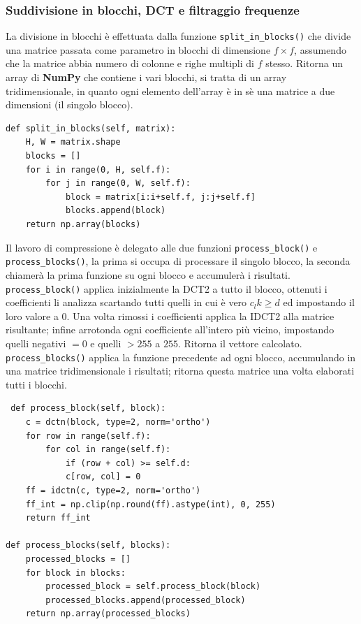 	\subsubsection{Suddivisione in blocchi, DCT e filtraggio frequenze}
	La divisione in blocchi è effettuata dalla funzione \texttt{split\_in\_blocks()} che divide una matrice passata come parametro in blocchi di dimensione \textit{$f \times f$}, assumendo che la matrice abbia numero di colonne e righe multipli di $f$ stesso.
	Ritorna un array di \textbf{NumPy} che contiene i vari blocchi, si tratta di un array tridimensionale, in quanto ogni elemento dell'array è in sè una matrice a due dimensioni (il singolo blocco).
	\begin{listing}[ht]
		\begin{verbatim}
def split_in_blocks(self, matrix):
	H, W = matrix.shape
	blocks = []
	for i in range(0, H, self.f):
		for j in range(0, W, self.f):
			block = matrix[i:i+self.f, j:j+self.f]
			blocks.append(block)
	return np.array(blocks)
		\end{verbatim}
	\end{listing}
	
	Il lavoro di compressione è delegato alle due funzioni \texttt{process\_block()} e \texttt{process\_blocks()}, la prima si occupa di processare il singolo blocco, la seconda chiamerà la prima funzione su ogni blocco e accumulerà i risultati.
	\texttt{process\_block()} applica inizialmente la DCT2 a tutto il blocco, ottenuti i coefficienti li analizza scartando tutti quelli in cui è vero $c_lk \geq d$ ed impostando il loro valore a 0.
	Una volta rimossi i coefficienti applica la IDCT2 alla matrice risultante; infine arrotonda ogni coefficiente all'intero più vicino, impostando quelli negativi $= 0$ e quelli $> 255$ a $255$.
	Ritorna il vettore calcolato.
	\texttt{process\_blocks()} applica la funzione precedente ad ogni blocco, accumulando in una matrice tridimensionale i risultati; ritorna questa matrice una volta elaborati tutti i blocchi.
	\begin{listing}[ht]
		\begin{verbatim}
 def process_block(self, block):
	c = dctn(block, type=2, norm='ortho')
	for row in range(self.f):
		for col in range(self.f):
			if (row + col) >= self.d:
			c[row, col] = 0
	ff = idctn(c, type=2, norm='ortho')
	ff_int = np.clip(np.round(ff).astype(int), 0, 255)
	return ff_int

def process_blocks(self, blocks):
	processed_blocks = []
	for block in blocks:
		processed_block = self.process_block(block)
		processed_blocks.append(processed_block)
	return np.array(processed_blocks)
		\end{verbatim}
	\end{listing}
		
